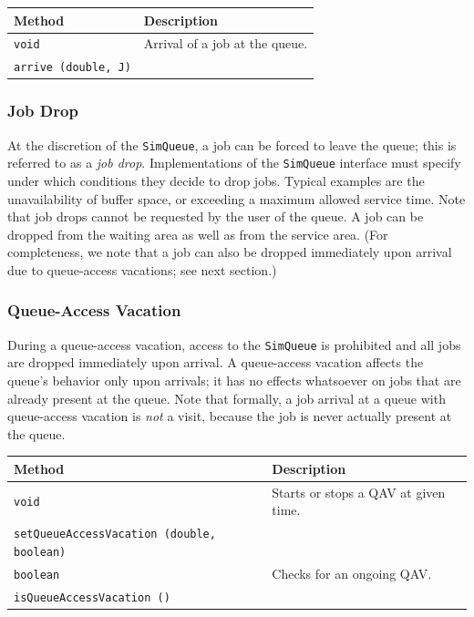 \documentclass[12pt]{book}
\begin{document}
\begin{tabular}{|l|l|}
  \hline
  {\bf Method} & {\bf Description} \\
  \hline
  \lstinline[basicstyle=\footnotesize]!void!
    & Arrival of a job at the queue.
    \\
  \lstinline[basicstyle=\footnotesize]!arrive (double, J)!
    &
    \\ \hline
\end{tabular}

\subsubsection{Job Drop}

At the discretion of the \lstinline-SimQueue-,
  a job can be forced to leave the queue;
  this is referred to as a {\em job drop}.
Implementations of the \lstinline-SimQueue- interface must
  specify under which conditions they decide to drop jobs.
Typical examples are the unavailability of buffer space,
  or exceeding a maximum allowed service time.
Note that job drops cannot be requested by the user of the queue.
A job can be dropped
  from the waiting area
  as well as
  from the service area.
(For completeness, we note that a job
  can also be dropped immediately upon arrival due
  to queue-access vacations; see next section.)

\subsubsection{Queue-Access Vacation}
\label{queue-access-vacation}

During a queue-access vacation,
  access to the \lstinline|SimQueue| is prohibited
  and all jobs are dropped immediately upon arrival.
A queue-access vacation affects the queue's behavior only upon arrivals;
  it has no effects whatsoever on jobs that are already present
  at the queue.
Note that formally, a job arrival at a queue
  with queue-access vacation
  is {\em not\/} a visit,
  because the job is never actually present at the queue.

\begin{tabular}{|l|l|}
  \hline
  {\bf Method} & {\bf Description} \\
  \hline
  \lstinline[basicstyle=\footnotesize]!void!
    & Starts or stops a QAV at given time.
    \\
  \lstinline[basicstyle=\footnotesize]!setQueueAccessVacation (double, boolean)!
    &
    \\ \hline
  \lstinline[basicstyle=\footnotesize]!boolean!
    & Checks for an ongoing QAV.
    \\
  \lstinline[basicstyle=\footnotesize]!isQueueAccessVacation ()!
    &
    \\ \hline
\end{tabular}
\end{document}
